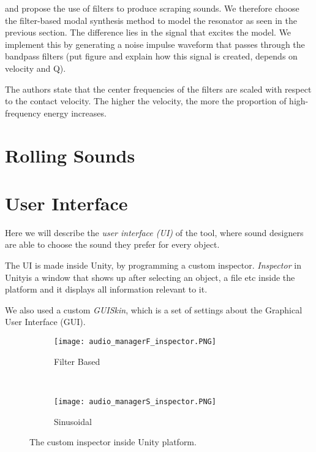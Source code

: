 \cite{gaver1993we} and \cite{van2001foleyautomatic} propose the use of filters to produce scraping sounds. We therefore choose the filter-based modal synthesis method to model the resonator as seen in the previous section. The difference lies in the signal that excites the model. We implement this by generating a noise impulse waveform that passes through the bandpass filters (put figure and explain how this signal is created, depends on velocity and Q). 

The authors state that the center frequencies of the filters are scaled with respect to the contact velocity. The higher the velocity, the more the proportion of high-frequency energy increases. 


\section{Rolling Sounds}

\section{User Interface}
Here we will describe the \textit{user interface (UI)} of the tool, where sound designers are able to choose the sound they prefer for every object.

The UI is made inside Unity\textregistered, by programming a custom inspector. \textit{Inspector} in Unity\textregistered is a window that shows up after selecting an object, a file etc inside the platform and it displays all information relevant to it.

We also used a custom \textit{GUISkin}, which is a set of settings about the Graphical User Interface (GUI). 

\begin{figure}[H]
    \centering
    \begin{subfigure}[b]{0.4\textwidth}
        \texttt{[image: audio\_managerF\_inspector.PNG]}
        \caption{Filter Based}
        \label{fig:FB}
    \end{subfigure}
    ~ %
    \begin{subfigure}[b]{0.4\textwidth}
        \texttt{[image: audio\_managerS\_inspector.PNG]}
        \caption{Sinusoidal}
        \label{fig:sin}
    \end{subfigure}
    \caption{The custom inspector inside Unity platform.}\label{fig:custom_insp}
\end{figure}

